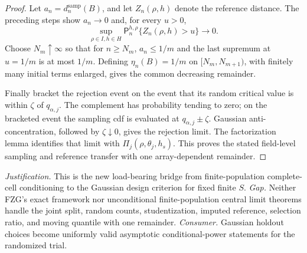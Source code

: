 \documentclass{article}
\begin{document}
\begin{proof}
Let \(a_n=d_n^{\mathrm{samp}}(B)\), and let \(Z_n(\rho,h)\) denote the reference distance.  The preceding steps show \(a_n\to0\) and, for every \(u>0\),
\[
\sup_{\rho\in I,h\in H}\mathsf P_n^{h,\rho}\{Z_n(\rho,h)>u\}\to0.
\]
Choose \(N_m\uparrow\infty\) so that for \(n\ge N_m\), \(a_n\le1/m\) and the last supremum at \(u=1/m\) is at most \(1/m\).  Defining \(\eta_n(B)=1/m\) on \([N_m,N_{m+1})\), with finitely many initial terms enlarged, gives the common decreasing remainder.

Finally bracket the rejection event on the event that its random critical value is within \(\zeta\) of \(q_{\alpha,j}\).  The complement has probability tending to zero; on the bracketed event the sampling cdf is evaluated at \(q_{\alpha,j}\pm\zeta\).  Gaussian anti-concentration, followed by \(\zeta\downarrow0\), gives the rejection limit.  The factorization lemma identifies that limit with \(\Pi_j(\rho,\theta_j,h_s)\).  This proves the stated field-level sampling and reference transfer with one array-dependent remainder.
\end{proof}
\par\smallskip\noindent \textit{Justification.} This is the new load-bearing bridge from finite-population complete-cell conditioning to the Gaussian design criterion for fixed finite \(S\). \textit{Gap.} Neither FZG's exact framework nor unconditional finite-population central limit theorems handle the joint split, random counts, studentization, imputed reference, selection ratio, and moving quantile with one remainder. \textit{Consumer.} Gaussian holdout choices become uniformly valid asymptotic conditional-power statements for the randomized trial.
\end{document}
